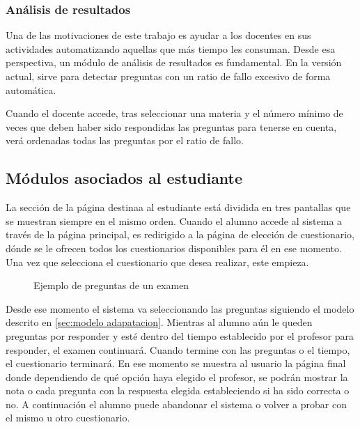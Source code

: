 \subsubsection{Análisis de resultados}

Una de las motivaciones de este trabajo es ayudar a los docentes en sus actividades automatizando aquellas que más tiempo les consuman. Desde esa perspectiva, un módulo de análisis de resultados es fundamental. En la versión actual, sirve para detectar preguntas con un ratio de fallo excesivo de forma automática. 

Cuando el docente accede, tras seleccionar una materia y el número mínimo de veces que deben haber sido respondidas las preguntas para tenerse en cuenta, verá ordenadas todas las preguntas por el ratio de fallo.

\subsection{Módulos asociados al estudiante}

La sección de la página destinaa al estudiante está dividida en tres pantallas que se muestran siempre en el mismo orden. Cuando el alumno accede al sistema a través de la página principal, es redirigido a la página de elección de cuestionario, dónde se le ofrecen todos los cuestionarios disponibles para él en ese momento. Una vez que selecciona el cuestionario que desea realizar, este empieza.

\begin{figure}[!htp]

	\caption{Ejemplo de preguntas de un examen}
	\label{fig:e-valUAM examenes}
\end{figure}

Desde ese momento el sistema va seleccionando las preguntas siguiendo el modelo descrito en \ref{sec:modelo adapatacion}. Mientras al alumno aún le queden preguntas por responder y esté dentro del tiempo establecido por el profesor para responder, el examen continuará. Cuando termine con las preguntas o el tiempo, el cuestionario terminará. En ese momento se muestra al usuario la página final donde dependiendo de qué opción haya elegido el profesor, se podrán mostrar la nota o cada pregunta con la respuesta elegida estableciendo si ha sido correcta o no. A continuación el alumno puede abandonar el sistema o volver a probar con el mismo u otro cuestionario.

